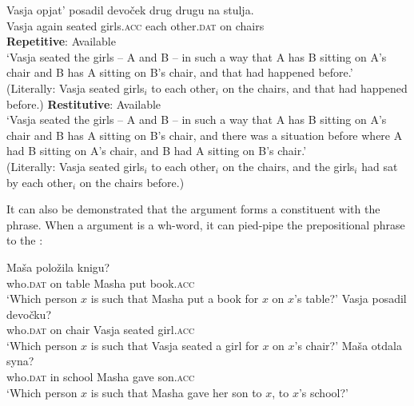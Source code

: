 \documentclass[output=paper]{langscibook}
\begin{document}
 \ea\label{ex:bondarenko:41}
\gll Vasja opjat’ posadil devoček drug drugu na stulja.\\
     Vasja again seated girls.\textsc{acc} each other.\textsc{dat} on chairs\\
\ea \textbf{Repetitive}: Available\\
‘Vasja seated the girls -- A and B -- in such a way that A has B sitting on A's chair and B has A sitting on B's chair, and that had happened before.’\\
(Literally: Vasja seated girls$_i$ to each other$_i$ on the chairs, and that had happened before.)
\ex \textbf{Restitutive}: Available\\
‘Vasja seated the girls -- A and B -- in such a way that A has B sitting on A's chair and B has A sitting on B's chair, and there was a situation before where A had B sitting on A's chair, and B had A sitting on B's chair.'\\
(Literally: Vasja seated girls$_i$ to each other$_i$ on the chairs, and the   girls$_i$ had sat by each other$_i$ on the chairs before.)\\
\z\z


\noindent It can also be demonstrated that the  argument forms a constituent with the  phrase. When a  argument is a wh-word, it can pied-pipe the prepositional phrase to the :


 \ea\label{ex:bondarenko:42}
\ea{} Maša položila knigu?\\
     {} who.\textsc{dat} on table Masha put book.\textsc{acc}\\
\glt `Which person $x$ is such that Masha put a book for $x$ on $x$'s table?'
\ex\label{ex:bondarenko:43}
 Vasja posadil devočku?\\
     {} who.\textsc{dat} on chair Vasja seated girl.\textsc{acc}\\
\glt `Which person $x$ is such that Vasja seated a girl for $x$ on $x$'s chair?'
\ex\label{ex:bondarenko:44}
 Maša otdala syna?\\
     {} who.\textsc{dat} in school Masha gave son.\textsc{acc}\\
\glt `Which person $x$ is such that Masha gave her son to $x$, to $x$'s school?'
\z\z
\end{document}
